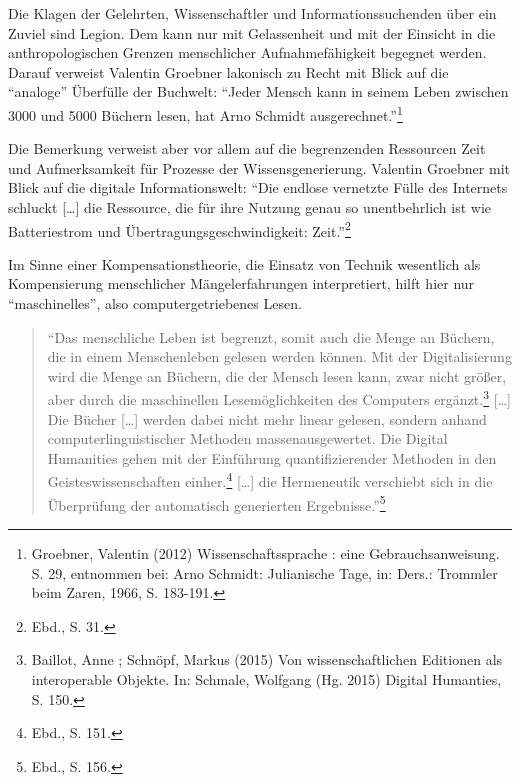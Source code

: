 \documentclass[a4paper,
fontsize=11pt,
oneside,
numbers=noperiodatend,
parskip=half-,
bibliography=totoc,
final
]{scrartcl}
\begin{document}
Die Klagen der Gelehrten, Wissenschaftler und Informationssuchenden über
ein Zuviel sind Legion. Dem kann nur mit Gelassenheit und mit der
Einsicht in die anthropologischen Grenzen menschlicher Aufnahmefähigkeit
begegnet werden. Darauf verweist Valentin Groebner lakonisch zu Recht
mit Blick auf die \enquote{analoge} Überfülle der Buchwelt:
\enquote{Jeder Mensch kann in seinem Leben zwischen 3000 und 5000
Büchern lesen, hat Arno Schmidt ausgerechnet.}\footnote{Groebner,
  Valentin (2012) Wissenschaftssprache : eine Gebrauchsanweisung. S. 29,
  entnommen bei: Arno Schmidt: Julianische Tage, in: Ders.: Trommler
  beim Zaren, 1966, S. 183-191.}

Die Bemerkung verweist aber vor allem auf die begrenzenden Ressourcen
Zeit und Aufmerksamkeit für Prozesse der Wissensgenerierung. Valentin
Groebner mit Blick auf die digitale Informationswelt: \enquote{Die
endlose vernetzte Fülle des Internets schluckt {[}\ldots{}{]} die
Ressource, die für ihre Nutzung genau so unentbehrlich ist wie
Batteriestrom und Übertragungsgeschwindigkeit: Zeit.}\footnote{Ebd., S.
  31.}

Im Sinne einer Kompensationstheorie, die Einsatz von Technik wesentlich
als Kompensierung menschlicher Mängelerfahrungen interpretiert, hilft
hier nur \enquote{maschinelles}, also computergetriebenes Lesen.

\begin{quote}
\enquote{Das menschliche Leben ist begrenzt, somit auch die Menge an
Büchern, die in einem Menschenleben gelesen werden können. Mit der
Digitalisierung wird die Menge an Büchern, die der Mensch lesen kann,
zwar nicht größer, aber durch die maschinellen Lesemöglichkeiten des
Computers ergänzt.\footnote{Baillot, Anne ; Schnöpf, Markus (2015) Von
  wissenschaftlichen Editionen als interoperable Objekte. In: Schmale,
  Wolfgang (Hg. 2015) Digital Humanties, S. 150.} {[}\ldots{}{]} Die
Bücher {[}\ldots{}{]} werden dabei nicht mehr linear gelesen, sondern
anhand computerlinguistischer Methoden massenausgewertet. Die Digital
Humanities gehen mit der Einführung quantifizierender Methoden in den
Geisteswissenschaften einher.\footnote{Ebd., S. 151.} {[}\ldots{}{]} die
Hermeneutik verschiebt sich in die Überprüfung der automatisch
generierten Ergebnisse.}\footnote{Ebd., S. 156.}
\end{quote}
\end{document}
